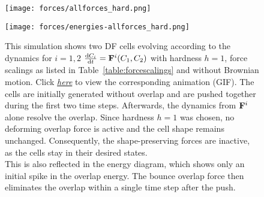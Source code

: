 \begin{figure}[htbp]
	\centering
	\texttt{[image: forces/allforces\_hard.png]}\\[1ex]
	\begin{minipage}[c]{0.35\textwidth}
		\texttt{[image: forces/energies-allforces\_hard.png]}
	\end{minipage}\hfill
	\begin{minipage}[c]{0.6\textwidth}
		\caption{
		This simulation shows two DF cells evolving according to the dynamics for $i = 1, 2$
		$\frac{\mathrm{d} C_i}{\mathrm{d} t} = \mathbf{F}^i(C_1, C_2)$ with hardness $h=1$, force scalings as listed in Table~\ref{table:forcescalings} and without Brownian motion.
		Click \href{https://github.com/tivo476c/FlexibleCellModel/blob/master/figures/gifs/showForces/show-allForces-hard.gif}{\textit{here}} to view the corresponding animation (GIF).
		The cells are initially generated without overlap and are pushed together during the first two time steps. 
		Afterwards, the dynamics from $\mathbf{F}^i$ alone resolve the overlap.
		Since hardness $h=1$ was chosen, no deforming overlap force is active and the cell shape remains unchanged. 
		Consequently, the shape-preserving forces are inactive, as the cells stay in their desired states.\\
		This is also reflected in the energy diagram, which shows only an initial spike in the overlap energy. 
		The bounce overlap force then eliminates the overlap within a single time step after the push.
		}
		\label{fig:allForces-hard}
	\end{minipage}
\end{figure}

